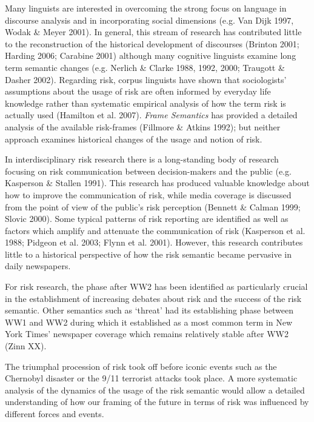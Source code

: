 Many linguists are interested in overcoming the strong focus on language in discourse analysis and in incorporating social dimensions (e.g. Van Dijk 1997, Wodak \& Meyer 2001). In general, this stream of research has contributed little to the reconstruction of the historical development of discourses (Brinton 2001; Harding 2006; Carabine 2001) although many cognitive linguists examine long term semantic changes (e.g. Nerlich \& Clarke 1988, 1992, 2000; Traugott \& Dasher 2002). Regarding risk, corpus linguists have shown that sociologists' assumptions about the usage of risk are often informed by everyday life knowledge rather than systematic empirical analysis of how the term risk is actually used (Hamilton et al. 2007). \emph{Frame Semantics} has provided a detailed analysis of the available risk-frames (Fillmore \& Atkins 1992); but neither approach examines historical changes of the usage and notion of risk.

In interdisciplinary risk research there is a long-standing body of research focusing on risk communication between decision-makers and the public (e.g. Kasperson \& Stallen 1991). This research has produced valuable knowledge about how to improve the communication of risk, while media coverage is discussed from the point of view of the public's risk perception (Bennett \& Calman 1999; Slovic 2000). Some typical patterns of risk reporting are identified as well as factors which amplify and attenuate the communication of risk (Kasperson et al. 1988; Pidgeon et al. 2003; Flynn et al. 2001). However, this research contributes little to a historical perspective of how the risk semantic became pervasive in daily newspapers. 


For risk research, the phase after WW2 has been identified as particularly crucial in the establishment of increasing debates about risk and the success of the risk semantic. Other semantics such as `threat' had its establishing phase between WW1 and WW2 during which it established as a most common term in New York Times' newspaper coverage which remains relatively stable after WW2 (Zinn XX).

The triumphal procession of risk took off before iconic events such as the Chernobyl disaster or the 9\slash 11 terrorist attacks took place. A more systematic analysis of the dynamics of the usage of the risk semantic would allow a detailed understanding of how our framing of the future in terms of risk was influenced by different forces and events. 


